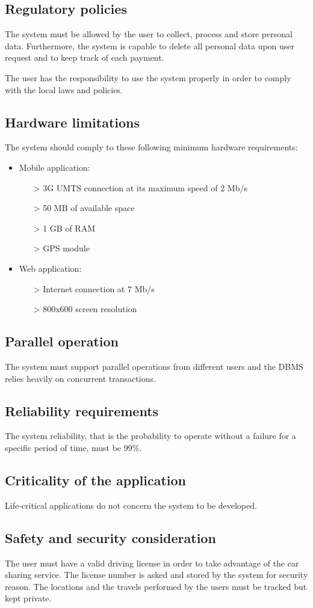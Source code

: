 \subsection{Regulatory policies}
The system must be allowed by the user to collect, process and store personal data. Furthermore, the system is capable to delete all personal data upon user request and to keep track of each payment.

The user has the responsibility to use the system properly in order to comply with the local laws and policies.

\subsection{Hardware limitations} \label{ssec:hlimit}
The system should comply to these following minimum hardware requirements:
\begin{itemize}
\item Mobile application:
	\begin{itemize}
	\item[>] 3G UMTS connection at its maximum speed of 2 Mb/s
	\item[>] 50 MB of available space
	\item[>] 1 GB of RAM
	\item[>] GPS module %
	\end{itemize}
\item Web application:
	\begin{itemize}
	\item[>] Internet connection at 7 Mb/s
	\item[>] 800x600 screen resolution
	\end{itemize}
\end{itemize}

\subsection{Parallel operation}
The system must support parallel operations from different users and the DBMS relies heavily on concurrent transactions.

\subsection{Reliability requirements}
The system reliability, that is the probability to operate without a failure for a specific period of time, must be 99\%.

\subsection{Criticality of the application}
Life-critical applications do not concern the system to be developed.

\subsection{Safety and security consideration}
The user must have a valid driving license in order to take advantage of the car sharing service. The license number is asked and stored by the system for security reason. The locations and the travels performed by the users must be tracked but kept private.